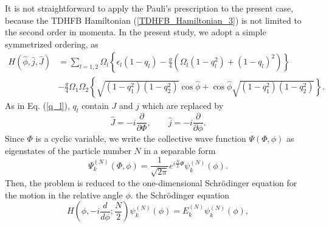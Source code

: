 \documentclass[%
superscriptaddress,
preprint,
showpacs,
nofootinbib,
amsmath,amssymb,
aps,
prc,
floatfix ]%
{revtex4-1}
\begin{document}
It is not straightforward to apply the Pauli's prescription
to the present case, 
because the TDHFB Hamiltonian (\ref{TDHFB_Hamiltonian_3})
is not limited to the second order in momenta.
In the present study, 
we adopt a simple symmetrized ordering, as
\begin{align}
	H(\hat{\phi},\hat{j},\hat{J})
	&= \sum_{l=1,2} \Omega_l \left\{ \epsilon_l (1-q_l) 
	- \frac{g}{4} (\Omega_l(1-q_l^2)+(1-q_l)^2) \right\}
	\nonumber \\
	&- \frac{g}{4}\Omega_{1}\Omega_{2}
	\left\{ \sqrt{(1-q_{1}^2)(1-q_{2}^2)}\cos{\hat{\phi}}
	+ \cos{\hat{\phi}}\sqrt{(1-q_{1}^2)(1-q_{2}^2)} \right\} .
\label{canonical_quantized_H}
\end{align}
As in Eq. (\ref{q_l}), $q_l$ contain $J$ and $j$ which
are replaced by
\begin{equation}
	\hat{J} = -i\frac{\partial}{\partial\Phi},\quad\quad
	\hat{j} = -i\frac{\partial}{\partial\phi} .
\end{equation}
Since $\Phi$ is a cyclic variable, 
we write the collective wave function $\Psi(\Phi,\phi)$ as eigenstates
of the particle number $N$ in a separable form
\begin{equation}
  \Psi_k^{(N)}(\Phi,\phi) = 
	\frac{1}{\sqrt{2\pi}}e^{i\frac{N}{2}\Phi}\psi_k^{(N)}(\phi) .
\end{equation}
Then, the problem is reduced to the one-dimensional Schr\"{o}dinger
equation for the motion in the relative angle $\phi$.
the Schr\"{o}dinger equation
\begin{equation}
	H\left( \phi,-i\frac{d}{d\phi};\frac{N}{2} \right)
	\psi_k^{(N)}(\phi) = E_k^{(N)}\psi_k^{(N)}(\phi),
	\label{Schroedinger_eq}
\end{equation}
\end{document}
